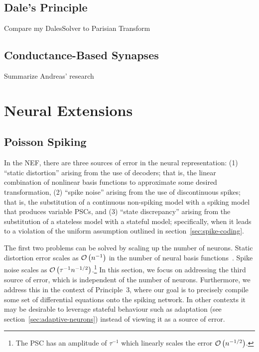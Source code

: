 \subsection{Dale's Principle}

Compare my DalesSolver to Parisian Transform

\subsection{Conductance-Based Synapses}

Summarize Andreas' research


\section{Neural Extensions}

\subsection{Poisson Spiking}
\label{sec:poisson-spiking}

In the NEF, there are three sources of error in the neural representation: (1) ``static distortion'' arising from the use of decoders; that is, the linear combination of nonlinear basis functions to approximate some desired transformation, (2) ``spike noise'' arising from the use of discontinuous spikes; that is, the substitution of a continuous non-spiking model with a spiking model that produces variable PSCs, and (3) ``state discrepancy'' arising from the substitution of a stateless model with a stateful model; specifically, when it leads to a violation of the uniform assumption outlined in section~\ref{sec:spike-coding}.

The first two problems can be solved by scaling up the number of neurons.
Static distortion error scales as $\mathcal{O}\left({n^{-1}}\right)$ in the number of neural basis functions~\citep{eliasmith2003a}.
Spike noise scales as $\mathcal{O}\left({ \tau^{-1} n^{-1/2} }\right)$.\footnote{The PSC has an amplitude of $\tau^{-1}$ which linearly scales the error $\mathcal{O}\left({n^{-1/2}}\right)$.}
In this section, we focus on addressing the third source of error, which is independent of the number of neurons.
Furthermore, we address this in the context of Principle~3, where our goal is to precisely compile some set of differential equations onto the spiking network.
In other contexts it may be desirable to leverage stateful behaviour such as adaptation (see section~\ref{sec:adaptive-neurons}) instead of viewing it as a source of error.

